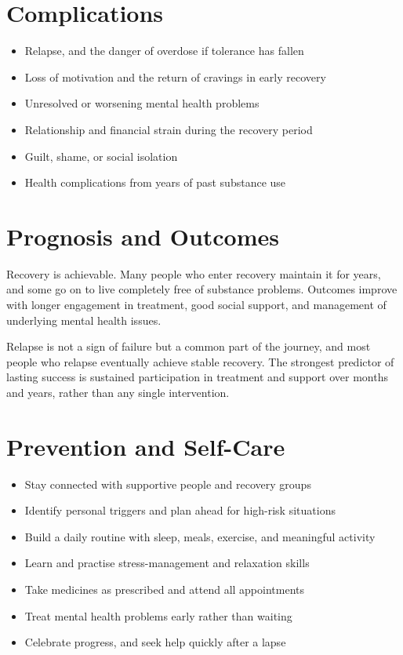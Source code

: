 \section*{Complications}
\begin{itemize}
    \item Relapse, and the danger of overdose if tolerance has fallen
    \item Loss of motivation and the return of cravings in early recovery
    \item Unresolved or worsening mental health problems
    \item Relationship and financial strain during the recovery period
    \item Guilt, shame, or social isolation
    \item Health complications from years of past substance use
\end{itemize}

\section*{Prognosis and Outcomes}
Recovery is achievable. Many people who enter recovery maintain it for years, and some go on to live completely free of substance problems. Outcomes improve with longer engagement in treatment, good social support, and management of underlying mental health issues.

Relapse is not a sign of failure but a common part of the journey, and most people who relapse eventually achieve stable recovery. The strongest predictor of lasting success is sustained participation in treatment and support over months and years, rather than any single intervention.

\section*{Prevention and Self-Care}
\begin{itemize}
    \item Stay connected with supportive people and recovery groups
    \item Identify personal triggers and plan ahead for high-risk situations
    \item Build a daily routine with sleep, meals, exercise, and meaningful activity
    \item Learn and practise stress-management and relaxation skills
    \item Take medicines as prescribed and attend all appointments
    \item Treat mental health problems early rather than waiting
    \item Celebrate progress, and seek help quickly after a lapse
\end{itemize}


